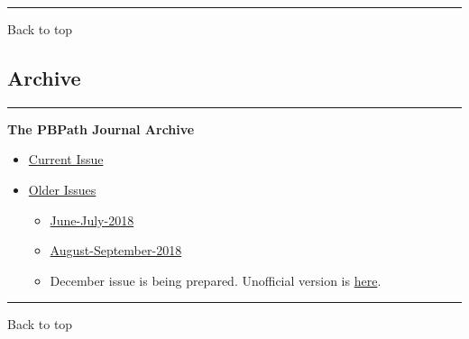 \documentclass[]{article}
\begin{document}
\begin{center}\rule{0.5\linewidth}{\linethickness}\end{center}

Back to top

\pagebreak

\hypertarget{archive}{%
\subsection{Archive}\label{archive}}

\begin{center}\rule{0.5\linewidth}{\linethickness}\end{center}

\textbf{The PBPath Journal Archive}

\begin{itemize}
\item
  \href{http://pbpath.org/journal-watch/}{Current Issue}
\item
  \href{http://pbpath.org/journal-watch-archive/}{Older Issues}

  \begin{itemize}
  \item
    \href{http://pbpath.org/pbpath-journal-watch-june-july-2018/}{June-July-2018}
  \item
    \href{http://pbpath.org/pbpath-journal-watch-august-september-2018/}{August-September-2018}
  \item
    December issue is being prepared. Unofficial version is
    \href{http://pbpath.org/journal-watch-upcoming-issue/}{here}.
  \end{itemize}
\end{itemize}

\begin{center}\rule{0.5\linewidth}{\linethickness}\end{center}

Back to top
\end{document}
